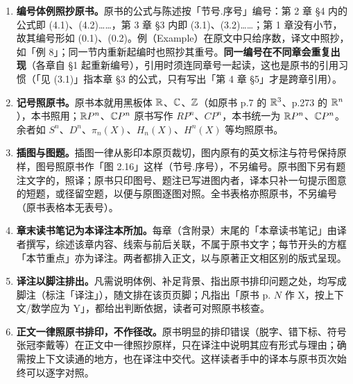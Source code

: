 \begin{enumerate}[leftmargin=2.2em,itemsep=2pt,topsep=2pt]
\item \textbf{编号体例照抄原书。}原书的公式与陈述按「节号.序号」编号：第 2 章 §4 内的公式即 (4.1)、(4.2)……，第 3 章 §3 内即 (3.1)、(3.2)……；第 1 章没有小节，故其编号形如 (0.1)、(0.2)。例（Example）在原文中只给序数，译文中照抄，如「例 8」；同一节内重新起编时也照抄其重号。\textbf{同一编号在不同章会重复出现}（各章自 §1 起重新编号），引用时须连同章号一起读，这也是原书的引用习惯（「见 (3.1)」指本章 §3 的公式，只有写出「第 4 章 §5」才是跨章引用）。
\item \textbf{记号照原书。}原书本就用黑板体 $\mathbb{R}$、$\mathbb{C}$、$\mathbb{Z}$（如原书 p.7 的 $\mathbb{R}^3$、p.273 的 $\mathbb{R}^n$），本书照用；$\mathbb{R} P^n$、$\mathbb{C} P^n$ 原书写作 $RP^n$、$CP^n$，本书统一为 $\mathbb{R}P^n$、$\mathbb{C}P^n$。余者如 $S^n$、$D^n$、$\pi_n(X)$、$H_n(X)$、$H^n(X)$ 等均照原书。
\item \textbf{插图与图题。}插图一律从影印本原页裁切，图内原有的英文标注与符号保持原样，图号照原书作「图 2.16」这样（节号.序号），不另编号。原书图下另有题注文字的，照译；原书只印图号、题注已写进图内者，译本只补一句提示图意的短题，或径留空题，以便与原图逐图对照。全书表格亦照原书，不另编号（原书表格本无表号）。
\item \textbf{章末读书笔记为本译注本所加。}每章（含附录）末尾的「本章读书笔记」由译者撰写，综述该章内容、线索与前后关联，不属于原书文字；每节开头的方框「本节重点」亦为译注。两者都排入正文，以与原著正文相区别的版式呈现。
\item \textbf{译注以脚注排出。}凡需说明体例、补足背景、指出原书排印问题之处，均写成脚注（标注「译注」），随文排在该页页脚；凡指出「原书 p. $N$ 作 X，按上下文/数学应为 Y」，都给出判断依据，读者可对照原书核查。
\item \textbf{正文一律照原书排印，不作径改。}原书明显的排印错误（脱字、错下标、符号张冠李戴等）在正文中一律照抄原样，只在译注中说明其应有形式与理由；确需按上下文读通的地方，也在译注中交代。这样读者手中的译本与原书页次始终可以逐字对照。
\end{enumerate}


